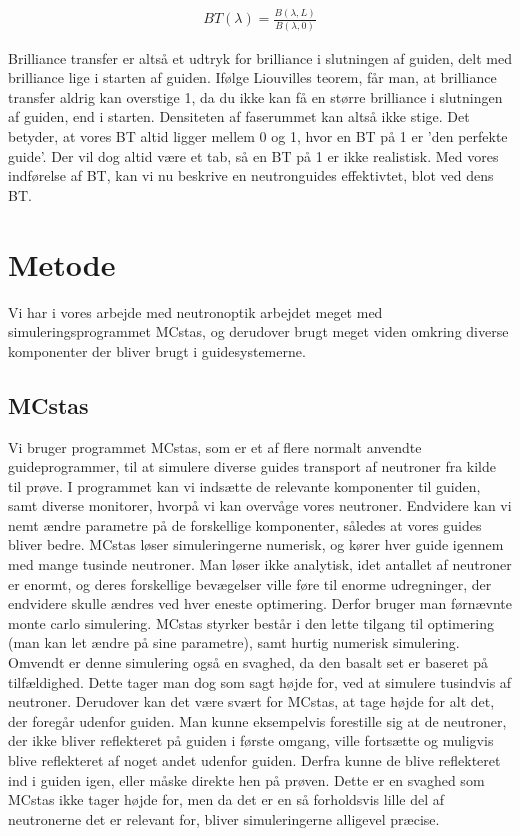 \documentclass[12pt,oneside,a4paper]{article}
\begin{document}
{{{{{\begin{align}
BT(\lambda)=\frac{B(\lambda, L)}{B(\lambda,0)}
\end{align}

Brilliance transfer er altså et udtryk for brilliance i slutningen af guiden, delt med brilliance lige i starten af guiden. Ifølge Liouvilles teorem,\cite{Kaspar_PhD} får man, at brilliance transfer aldrig kan overstige 1, da du ikke kan få en større brilliance i slutningen af guiden, end i starten. Densiteten af faserummet kan altså ikke stige. Det betyder, at vores BT altid ligger mellem 0 og 1, hvor en BT på 1 er 'den perfekte guide'. Der vil dog altid være et tab, så en BT på 1 er ikke realistisk. Med vores indførelse af BT, kan vi nu beskrive en neutronguides effektivtet, blot ved dens BT. \cite{report:ess_optimizations}





\section{Metode}
Vi har i vores arbejde med neutronoptik arbejdet meget med simuleringsprogrammet MCstas, og derudover brugt meget viden omkring diverse komponenter der bliver brugt i guidesystemerne.

\subsection{MCstas}
Vi bruger programmet MCstas, som er et af flere normalt anvendte guideprogrammer, til at simulere diverse guides transport af neutroner fra kilde til prøve. I programmet kan vi indsætte de relevante komponenter til guiden, samt diverse monitorer, hvorpå vi kan overvåge vores neutroner. Endvidere kan vi nemt ændre parametre på de forskellige komponenter, således at vores guides bliver bedre. MCstas løser simuleringerne numerisk, og kører hver guide igennem med mange tusinde neutroner. Man løser ikke analytisk, idet antallet af neutroner er enormt, og deres forskellige bevægelser ville føre til enorme udregninger, der endvidere skulle ændres ved hver eneste optimering. Derfor bruger man førnævnte monte carlo simulering. MCstas styrker består i den lette tilgang til optimering (man kan let ændre på sine parametre), samt hurtig numerisk simulering. Omvendt er denne simulering også en svaghed, da den basalt set er baseret på tilfældighed. Dette tager man dog som sagt højde for, ved at simulere tusindvis af neutroner. Derudover kan det være svært for MCstas, at tage højde for alt det, der foregår udenfor guiden. Man kunne eksempelvis forestille sig at de neutroner, der ikke bliver reflekteret på guiden i første omgang, ville fortsætte og muligvis blive reflekteret af noget andet udenfor guiden. Derfra kunne de blive reflekteret ind i guiden igen, eller måske direkte hen på prøven. Dette er en svaghed som MCstas ikke tager højde for, men da det er en så forholdsvis lille del af neutronerne det er relevant for, bliver simuleringerne alligevel præcise.


}}}}}
\end{document}
